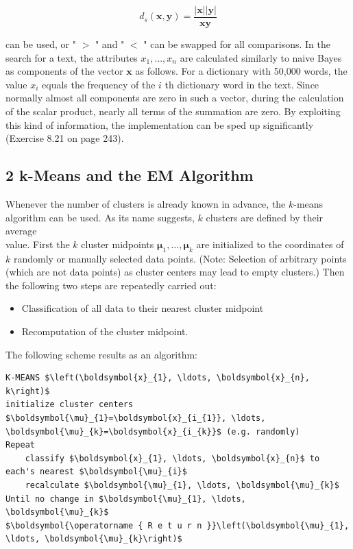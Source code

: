 \documentclass[10pt]{book}
\begin{document}
$$
d_{s}(\boldsymbol{x}, \boldsymbol{y})=\frac{|\boldsymbol{x}||\boldsymbol{y}|}{\boldsymbol{x} \boldsymbol{y}}
$$

can be used, or " $>$ " and " $<$ " can be swapped for all comparisons. In the search for a text, the attributes $x_{1}, \ldots, x_{n}$ are calculated similarly to naive Bayes as components of the vector $\boldsymbol{x}$ as follows. For a dictionary with 50,000 words, the value $x_{i}$ equals the frequency of the $i$ th dictionary word in the text. Since normally almost all components are zero in such a vector, during the calculation of the scalar product, nearly all terms of the summation are zero. By exploiting this kind of information, the implementation can be sped up significantly (Exercise 8.21 on page 243).

\subsection*{2 k-Means and the EM Algorithm}
Whenever the number of clusters is already known in advance, the $k$-means algorithm can be used. As its name suggests, $k$ clusters are defined by their average\\
value. First the $k$ cluster midpoints $\boldsymbol{\mu}_{1}, \ldots, \boldsymbol{\mu}_{k}$ are initialized to the coordinates of $k$ randomly or manually selected data points. (Note: Selection of arbitrary points (which are not data points) as cluster centers may lead to empty clusters.) Then the following two steps are repeatedly carried out:


\begin{itemize}
  \item Classification of all data to their nearest cluster midpoint
  \item Recomputation of the cluster midpoint.
\end{itemize}

The following scheme results as an algorithm:

\begin{verbatim}
K-MEANS $\left(\boldsymbol{x}_{1}, \ldots, \boldsymbol{x}_{n}, k\right)$
initialize cluster centers $\boldsymbol{\mu}_{1}=\boldsymbol{x}_{i_{1}}, \ldots, \boldsymbol{\mu}_{k}=\boldsymbol{x}_{i_{k}}$ (e.g. randomly)
Repeat
    classify $\boldsymbol{x}_{1}, \ldots, \boldsymbol{x}_{n}$ to each's nearest $\boldsymbol{\mu}_{i}$
    recalculate $\boldsymbol{\mu}_{1}, \ldots, \boldsymbol{\mu}_{k}$
Until no change in $\boldsymbol{\mu}_{1}, \ldots, \boldsymbol{\mu}_{k}$
$\boldsymbol{\operatorname { R e t u r n }}\left(\boldsymbol{\mu}_{1}, \ldots, \boldsymbol{\mu}_{k}\right)$
\end{verbatim}
\end{document}
